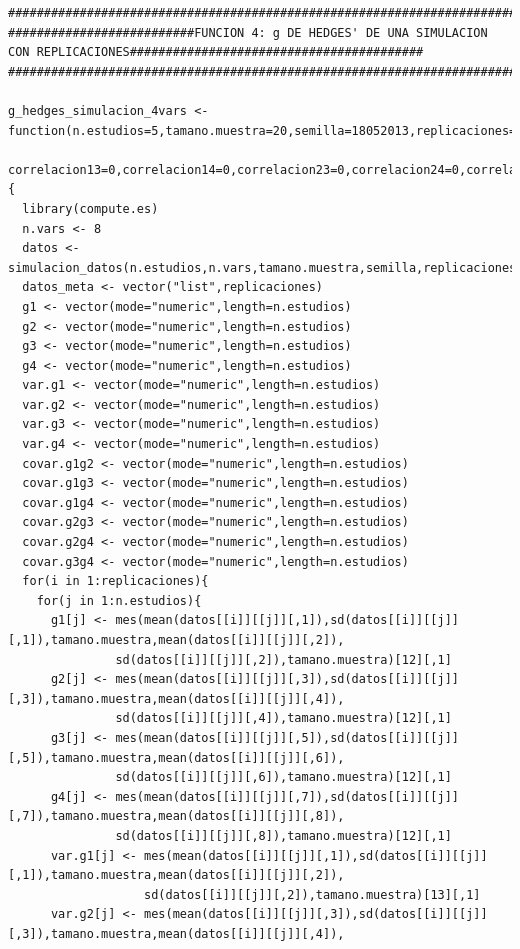 \documentclass[a4paper,openright,12pt]{report}
\begin{document}
{\begin{verbatim}
##############################################################################################################################
##########################FUNCION 4: g DE HEDGES' DE UNA SIMULACION CON REPLICACIONES#########################################
##############################################################################################################################

g_hedges_simulacion_4vars <- function(n.estudios=5,tamano.muestra=20,semilla=18052013,replicaciones=5,correlacion12=0,
                                      correlacion13=0,correlacion14=0,correlacion23=0,correlacion24=0,correlacion34=0){
  library(compute.es)
  n.vars <- 8
  datos <- simulacion_datos(n.estudios,n.vars,tamano.muestra,semilla,replicaciones)
  datos_meta <- vector("list",replicaciones)
  g1 <- vector(mode="numeric",length=n.estudios)
  g2 <- vector(mode="numeric",length=n.estudios)
  g3 <- vector(mode="numeric",length=n.estudios)
  g4 <- vector(mode="numeric",length=n.estudios)
  var.g1 <- vector(mode="numeric",length=n.estudios)
  var.g2 <- vector(mode="numeric",length=n.estudios)
  var.g3 <- vector(mode="numeric",length=n.estudios)
  var.g4 <- vector(mode="numeric",length=n.estudios)
  covar.g1g2 <- vector(mode="numeric",length=n.estudios) 
  covar.g1g3 <- vector(mode="numeric",length=n.estudios)
  covar.g1g4 <- vector(mode="numeric",length=n.estudios) 
  covar.g2g3 <- vector(mode="numeric",length=n.estudios)
  covar.g2g4 <- vector(mode="numeric",length=n.estudios) 
  covar.g3g4 <- vector(mode="numeric",length=n.estudios) 
  for(i in 1:replicaciones){
    for(j in 1:n.estudios){
      g1[j] <- mes(mean(datos[[i]][[j]][,1]),sd(datos[[i]][[j]][,1]),tamano.muestra,mean(datos[[i]][[j]][,2]),
               sd(datos[[i]][[j]][,2]),tamano.muestra)[12][,1]
      g2[j] <- mes(mean(datos[[i]][[j]][,3]),sd(datos[[i]][[j]][,3]),tamano.muestra,mean(datos[[i]][[j]][,4]),
               sd(datos[[i]][[j]][,4]),tamano.muestra)[12][,1]
      g3[j] <- mes(mean(datos[[i]][[j]][,5]),sd(datos[[i]][[j]][,5]),tamano.muestra,mean(datos[[i]][[j]][,6]),
               sd(datos[[i]][[j]][,6]),tamano.muestra)[12][,1]
      g4[j] <- mes(mean(datos[[i]][[j]][,7]),sd(datos[[i]][[j]][,7]),tamano.muestra,mean(datos[[i]][[j]][,8]),
               sd(datos[[i]][[j]][,8]),tamano.muestra)[12][,1]
      var.g1[j] <- mes(mean(datos[[i]][[j]][,1]),sd(datos[[i]][[j]][,1]),tamano.muestra,mean(datos[[i]][[j]][,2]),
                   sd(datos[[i]][[j]][,2]),tamano.muestra)[13][,1]
      var.g2[j] <- mes(mean(datos[[i]][[j]][,3]),sd(datos[[i]][[j]][,3]),tamano.muestra,mean(datos[[i]][[j]][,4]),

\end{verbatim}}
\end{document}
